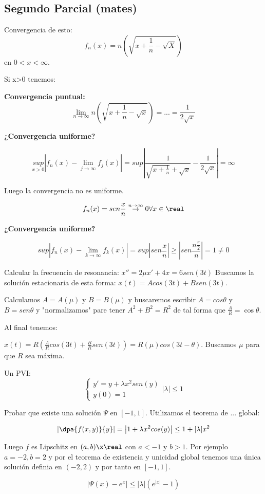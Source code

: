 \documentclass[nochap]{apuntes}
\begin{document}
\subsection{Segundo Parcial (mates)}
\begin{problem}[1]
Convergencia de esto:
\solution
\spart \[f_n(x) = n\left(\sqrt{x+\frac{1}{n} - \sqrt{X}}\right)\] en $0<x<\infty$.

Si x>0 tenemos:

\textbf{Convergencia puntual:}
\[\lim_{n\to\infty} n\left(\sqrt{x+\frac{1}{n}-\sqrt{x}}\right) = ... =\frac{1}{2\sqrt{x}}\]

\textbf{¿Convergencia uniforme?}

\[\underset{x>0}{sup} |f_n(x) - \lim_{j\to\infty} f_j(x) | = sup \left|\frac{1}{\sqrt{x+\frac{1}{n}} + \sqrt{x}} - \frac{1}{2\sqrt{x}}\right| = \infty\]

Luego la convergencia no es uniforme.

\spart
\[f_n(x) = sen\frac{x}{n} \overset{n\to\infty}{\to}0\forall x\in\real\]

\textbf{¿Convergencia uniforme?}

\[sup|f_n(x) - \lim_{k\to\infty}f_k(x)| = sup \left|sen\frac{x}{n}\right| \ge \left|sen\frac{n\frac{\pi}{2}}{n}\right| = 1 \neq 0\]
\end{problem}
\begin{problem}[2]
Calcular la frecuencia de resonancia:
$x''=2\mu x' + 4x = 6sen(3t)$
\solution
Buscamos la solución estacionaria de esta forma: $x(t) = Acos(3t) + Bsen(3t)$.

Calculamos $A = A(\mu)$ y $B = B(\mu)$ y buscaremos escribir $A = cos\theta$ y $B = sen\theta$ y "normalizamos" pare tener $A^2+B^2=R^2$ de tal forma que $\frac{A}{R} = \cos\theta$.

Al final tenemos:

$x(t)  = R\left(\frac{A}{R}cos(3t) + \frac{B}{R}sen(3t)\right) = R(\mu) cos(3t-\theta)$. Buscamos $\mu$ para que $R$ sea máxima.
\end{problem}

\begin{problem}[3]
Un PVI:
\[\left\{\begin{array}{c}
y'=y+\lambda x^2sen(y)\\y(0)=1
\end{array}\right.|\lambda|\leq 1\]

\solution

\spart Probar que existe una solución $\Psi$ en $[-1,1]$. Utilizamos el teorema de ... global:

\[\left|\dpa{f(x,y)}{y}\right| = \left| 1+\lambda x^2 cos(y)\right| \leq 1+|\lambda|x^2\]

Luego $f$ es Lipschitz en $(a,b)\x\real$ con $a<-1$ y $b>1$. Por ejemplo $a=-2,b=2$ y por el teorema de existencia y unicidad global tenemos una única solución definia en $(-2,2)$ y por tanto en $[-1,1]$.

\spart \[|\Psi(x) - e^x|\leq |\lambda| (e^{|x|}-1)\]


\end{problem}

\newpage
\printindex
\end{document}
